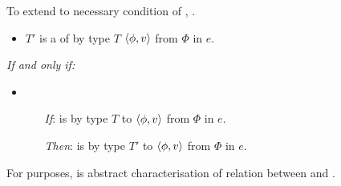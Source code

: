 \begin{note}
  To extend \ptC{} to necessary condition of \tC{}, \rotoc{}.
\end{note}

\begin{note}
  \begin{definition}[A \rotoc{}]
    \label{def:rotoc}
    \newline

    \begin{itemize}
    \item
      \(T'\) is a \emph{\tRep{}} of \vAgent{} \tC{} by type \(T\) \(\langle \phi, v \rangle\) from \(\Phi\) in \(e\).
    \end{itemize}

    \emph{If and only if:}

    \begin{itemize}
    \item
      \begin{itemize}
      \item[\emph{If}:]
        \vAgent{} is \tCV{} by type \(T\) to \(\langle \phi, v \rangle\) from \(\Phi\) in \(e\).
      \item[\emph{Then}:]
        \vAgent{} is \ptCV{} by type \(T'\) to \(\langle \phi, v \rangle\) from \(\Phi\) in \(e\).
      \end{itemize}
    \end{itemize}
    \vspace{-\baselineskip}
  \end{definition}

  For purposes, \rotoc{} is abstract characterisation of relation between \tC{} and \ptC{}.


\end{note}
